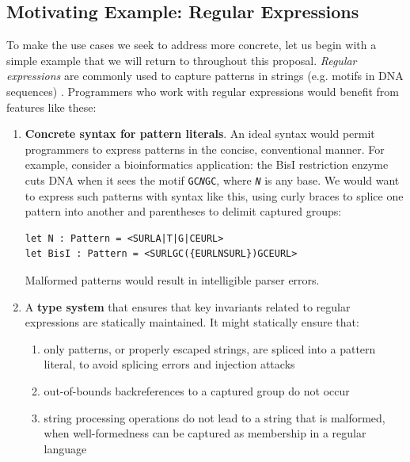 \subsection{Motivating Example: Regular Expressions}\label{regex}
To make the use cases we seek to address more concrete, let us begin with a simple example that we will return to throughout this proposal. \emph{Regular expressions} are commonly used to capture patterns in strings (e.g. motifs in DNA sequences) \cite{Thompson:1968:PTR:363347.363387}. Programmers who work with regular expressions would benefit from features like these:

\begin{enumerate}
\item \textbf{Concrete syntax for pattern literals}. An ideal syntax would permit programmers to express patterns in the concise, conventional manner. For example, consider a bioinformatics  application: the BisI restriction enzyme cuts DNA when it sees the motif \texttt{GC\textit{N}GC}, where \texttt{\textit{N}} is any base. We would want to express such patterns with syntax like this, using curly braces to splice one pattern into another and parentheses to delimit captured groups:
\begin{lstlisting}[numbers=none]
let N : Pattern = <SURLA|T|G|CEURL>
let BisI : Pattern = <SURLGC({EURLNSURL})GCEURL>\end{lstlisting}
Malformed patterns would result in intelligible {parser} errors.
\item A \textbf{type system} that ensures that key invariants related to regular expressions are statically maintained. It might statically ensure that: 
	\begin{enumerate}
	\item only patterns, or properly escaped strings, are spliced into a pattern literal, to avoid splicing errors and injection attacks \cite{owasp2013, Bravenboer:2007:PIA:1289971.1289975}
	\item out-of-bounds backreferences to a captured group do not occur \cite{spishak2012type}
	\item string processing operations do not lead to a string that is malformed, when well-formedness can be captured as membership in a regular language \cite{fulton-thesis,HosoyaVouillonPierce2000ICFP}
	\end{enumerate}

\end{enumerate}
